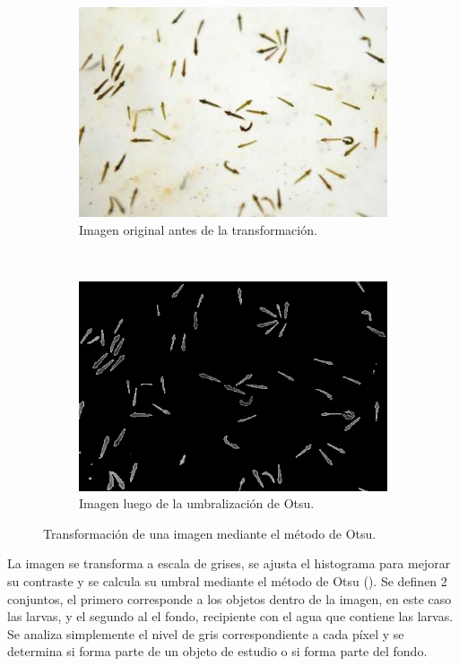 \begin{figure}[!htbp]
    \centering
    \begin{subfigure}[b]{0.4\textwidth}
            \includegraphics[width=\textwidth]{capitulo-5/graphics/larvas-original.png}
            \caption{Imagen original antes de la transformación.}
    \end{subfigure}
    ~~~~
    \begin{subfigure}[b]{0.4\textwidth}
            \includegraphics[width=\textwidth]{capitulo-5/graphics/larvas-otsu.png}
            \caption{Imagen luego de la umbralización de Otsu.}

    \end{subfigure}
    \caption{\label{fig:cap5-larvas-otsu} Transformación de una imagen mediante el método de
    Otsu.}
\end{figure}

La imagen se transforma a escala de grises, se ajusta el histograma para mejorar su contraste y se
calcula su umbral mediante el método de Otsu (). Se definen 2
conjuntos, el primero corresponde a los objetos dentro de la imagen, en este caso las larvas, y el
segundo al el fondo, recipiente con el agua que contiene las larvas.  Se analiza simplemente el
nivel de gris correspondiente a cada píxel y se determina si forma parte de un objeto de estudio o
si forma parte del fondo.
